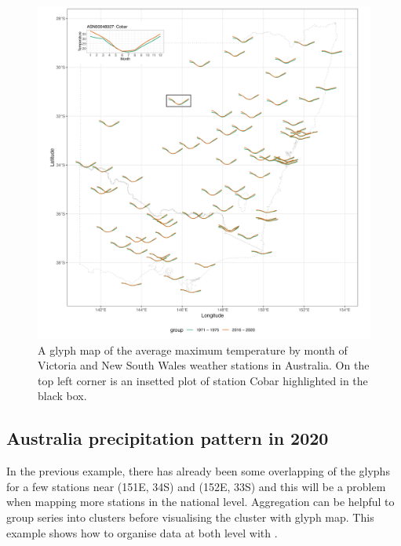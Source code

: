 \documentclass[
]{jss}
\begin{document}
\begin{CodeChunk}
\begin{figure}

{\centering \includegraphics[width=1\linewidth,height=0.7\textheight]{figures/basic-manip} 

}

\caption[A glyph map of the average maximum temperature by month of Victoria and New South Wales weather stations in Australia]{A glyph map of the average maximum temperature by month of Victoria and New South Wales weather stations in Australia. On the top left corner is an insetted plot of station Cobar highlighted in the black box.}\label{fig:basic-manip}
\end{figure}
\end{CodeChunk}

\hypertarget{australia-precipitation-pattern-in-2020}{%
\subsection{Australia precipitation pattern in
2020}\label{australia-precipitation-pattern-in-2020}}

In the previous example, there has already been some overlapping of the
glyphs for a few stations near (151E, 34S) and (152E, 33S) and this will
be a problem when mapping more stations in the national level.
Aggregation can be helpful to group series into clusters before
visualising the cluster with glyph map. This example shows how to
organise data at both level with .
\end{document}
